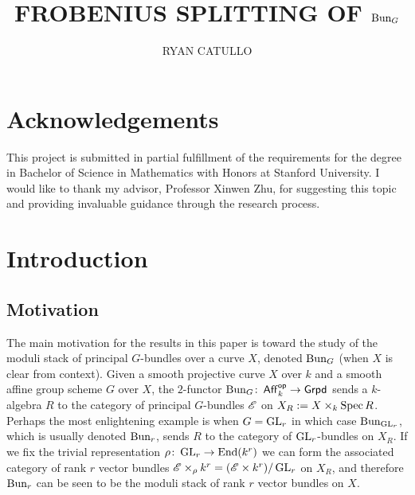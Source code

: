 \documentclass[12pt]{article}
\title{\large\bfseries{FROBENIUS SPLITTING OF $\operatorname{Bun}_G$}}
\author{\normalsize{RYAN CATULLO}}
\date{}
\begin{document}
\maketitle
{}

\tableofcontents

\vspace{4em}
\pagestyle{fancy}

\section*{Acknowledgements}
This project is submitted in partial fulfillment of the requirements for the degree in Bachelor of Science in Mathematics with Honors at Stanford University. I would like to thank my advisor, Professor Xinwen Zhu, for suggesting this topic and providing invaluable guidance through the research process.

\section{Introduction}
\subsection{Motivation}
The main motivation for the results in this paper is toward the study of the moduli stack of principal $G$-bundles over a curve $X$, denoted $\operatorname{Bun}_G$ (when $X$ is clear from context). Given a smooth projective curve $X$ over $k$ and a smooth affine group scheme $G$ over $X$, the $2$-functor $\operatorname{Bun}_G \colon \operatorname{\mathsf{Aff}}_k^{\operatorname{\mathsf{op}}} \to \operatorname{\mathsf{Grpd}}$ sends a $k$-algebra $R$ to the category of principal $G$-bundles $\mathscr{E}$ on $X_R := X \times_k \operatorname{Spec} R$. Perhaps the most enlightening example is when $G=\operatorname{GL}_r$ in which case $\operatorname{Bun}_{\operatorname{GL}_r}$, which is usually denoted $\operatorname{Bun}_r$, sends $R$ to the category of $\operatorname{GL}_r$-bundles on $X_R$. If we fix the trivial representation $\rho \colon \operatorname{GL}_r \to \operatorname{End}(k^r)$ we can form the associated category of rank $r$ vector bundles $\mathscr{E} \times_{\rho} k^r = (\mathscr{E} \times k^r)/\operatorname{GL}_r$ on $X_R$, and therefore $\operatorname{Bun}_r$ can be seen to be the moduli stack of rank $r$ vector bundles on $X$.
\end{document}
